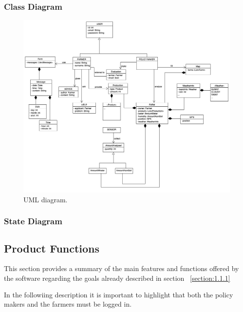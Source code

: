 \documentclass{article}
\begin{document}
\subsubsection{Class Diagram}
\begin{figure}[H]
    \begin{center}
    \includegraphics[width=1\textwidth]{images/UMLSW2_1.png}
    \caption{UML diagram.}
    \label{fig:dataaugmentation}
    \end{center}
\end{figure}
\subsubsection{State Diagram}
\newpage
\subsection{Product Functions}
This section provides a summary of the main features and 
functions offered by the software regarding
the goals already described in section ~\ref{section:1.1.1}

In the followiing description it is important to highlight that both
the policy makers and the farmers must be logged in.
\end{document}
